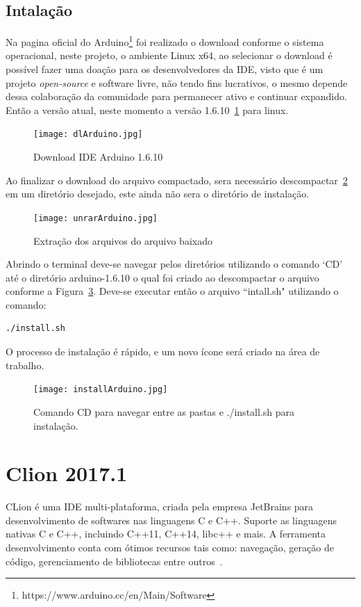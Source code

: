 \documentclass[a4paper,12pt,portuguese]{ufms-cpcx}
\begin{document}
\subsection{Intalação}
Na pagina oficial do Arduino\footnote{https://www.arduino.cc/en/Main/Software} foi realizado o download conforme o sistema operacional, neste projeto, o ambiente Linux x64, ao selecionar o download é possível fazer uma doação para os desenvolvedores da IDE, visto que é um projeto \textit{open-source} e software livre, não tendo fins lucrativos, o mesmo depende dessa colaboração da comunidade para permanecer ativo e continuar expandido. Então a versão atual, neste momento a versão 1.6.10~\ref{fig:arduino.tar} para linux.
\begin{figure}[H]	
	\centering
	\texttt{[image: dlArduino.jpg]}
	\caption{Download IDE Arduino 1.6.10}
	\label{fig:arduino.tar}
\end{figure}
Ao finalizar o download do arquivo compactado, sera necessário descompactar~\ref{fig:arduinoextracao} em um diretório desejado, este ainda não sera o diretório de instalação. 
\begin{figure}[H]	
	\centering
	\texttt{[image: unrarArduino.jpg]}
	\caption{Extração dos arquivos do arquivo baixado}
	\label{fig:arduinoextracao}
\end{figure}
Abrindo o terminal deve-se navegar pelos diretórios utilizando o comando ‘CD’ até o diretório arduino-1.6.10 o qual foi criado ao descompactar o arquivo conforme a Figura~\ref{fig:caminhoidearduino}. Deve-se executar então o arquivo ``intall.sh" utilizando o comando: 
\begin{lstlisting}
./install.sh
\end{lstlisting}
O processo de instalação é rápido, e um novo ícone será criado na área de trabalho.
\begin{figure}[H]	
	\centering
	\texttt{[image: installArduino.jpg]}
	\caption{Comando CD para navegar entre as pastas e ./install.sh para instalação.}
	\label{fig:caminhoidearduino}
\end{figure}

\section{Clion 2017.1}
CLion é uma IDE multi-plataforma, criada pela empresa JetBrains para desenvolvimento de softwares nas linguagens C e C++. Suporte as linguagens nativas C e C++, incluindo C++11, C++14, libc++ e mais. A ferramenta desenvolvimento conta com ótimos recursos tais como: navegação, geração de código, gerenciamento de bibliotecas entre outros~\cite{siteclion}.
\end{document}
